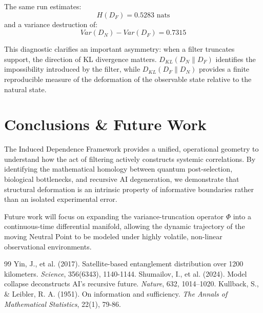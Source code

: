 \documentclass[11pt,twocolumn]{article}
\begin{document}
The same run estimates:
\begin{equation}
H(D_F) = 0.5283 \text{ nats}
\end{equation}
and a variance destruction of:
\begin{equation}
Var(D_N) - Var(D_F) = 0.7315
\end{equation}

This diagnostic clarifies an important asymmetry: when a filter truncates support, the direction of KL divergence matters. $D_{KL}(D_N \parallel D_F)$ identifies the impossibility introduced by the filter, while $D_{KL}(D_F \parallel D_N)$ provides a finite reproducible measure of the deformation of the observable state relative to the natural state.

\section{Conclusions \& Future Work}
The Induced Dependence Framework provides a unified, operational geometry to understand how the act of filtering actively constructs systemic correlations. By identifying the mathematical homology between quantum post-selection, biological bottlenecks, and recursive AI degeneration, we demonstrate that structural deformation is an intrinsic property of informative boundaries rather than an isolated experimental error.

Future work will focus on expanding the variance-truncation operator $\Phi$ into a continuous-time differential manifold, allowing the dynamic trajectory of the moving Neutral Point to be modeled under highly volatile, non-linear observational environments.

\begin{thebibliography}{99}
 Yin, J., et al. (2017). Satellite-based entanglement distribution over 1200 kilometers. \textit{Science}, 356(6343), 1140-1144.
 Shumailov, I., et al. (2024). Model collapse deconstructs AI's recursive future. \textit{Nature}, 632, 1014--1020.
 Kullback, S., \& Leibler, R. A. (1951). On information and sufficiency. \textit{The Annals of Mathematical Statistics}, 22(1), 79-86.
\end{thebibliography}
\end{document}
